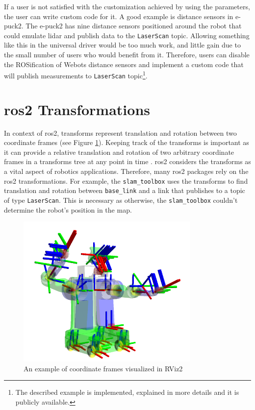 If a user is not satisfied with the customization achieved by using the parameters, the user can write custom code for it.
A good example is distance sensors in e-puck2.
The e-puck2 has nine distance sensors positioned around the robot that could emulate \ac{lidar} and publish data to the \texttt{LaserScan} topic.
Allowing something like this in the universal driver would be too much work, and little gain due to the small number of users who would benefit from it.
Therefore, users can disable the ROSification of Webots distance sensors and implement a custom code that will publish measurements to \texttt{LaserScan} topic\footnote{The described example is implemented, explained in more details and it is publicly available.}.

\section{\ac{ros2} Transformations}

In context of \ac{ros2}, transforms represent translation and rotation between two coordinate frames (see Figure \ref{fig:generalization:tf2_robot}).
Keeping track of the transforms is important as it can provide a relative translation and rotation of two arbitrary coordinate frames in a transforms tree at any point in time \cite{foote_tf_2013}. 
\ac{ros2} considers the transforms as a vital aspect of robotics applications.
Therefore, many \ac{ros2} packages rely on the \ac{ros2} transformations.
For example, the \texttt{slam\_toolbox} uses the transforms to find translation and rotation between \texttt{base\_link} and a link that publishes to a topic of type \texttt{LaserScan}.
This is necessary as otherwise, the \texttt{slam\_toolbox} couldn't determine the robot's position in the map.

\begin{figure}[H]
    \centering
    \includegraphics[width=0.8\textwidth]{generalization/figures/tf2_robot.png}
    \caption{An example of coordinate frames visualized in RViz2 \cite{foote_tf_2013}}
    \label{fig:generalization:tf2_robot}
\end{figure}

